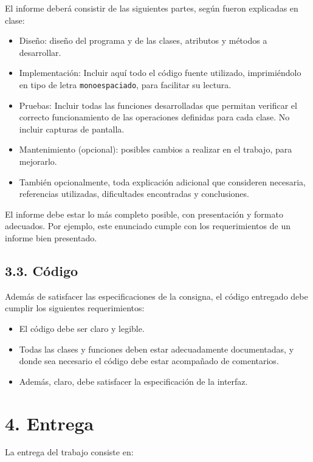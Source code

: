 \documentclass[12pt,spanish,]{article}
\begin{document}
El informe deberá consistir de las siguientes partes, según fueron
explicadas en clase:

\begin{itemize}
\item
  Diseño: diseño del programa y de las clases, atributos y métodos a
  desarrollar.
\item
  Implementación: Incluir aquí todo el código fuente utilizado,
  imprimiéndolo en tipo de letra \texttt{monoespaciado}, para facilitar
  su lectura.
\item
  Pruebas: Incluir todas las funciones desarrolladas que permitan
  verificar el correcto funcionamiento de las operaciones definidas para
  cada clase. No incluir capturas de pantalla.
\item
  Mantenimiento (opcional): posibles cambios a realizar en el trabajo,
  para mejorarlo.
\item
  También opcionalmente, toda explicación adicional que consideren
  necesaria, referencias utilizadas, dificultades encontradas y
  conclusiones.
\end{itemize}

El informe debe estar lo más completo posible, con presentación y
formato adecuados. Por ejemplo, este enunciado cumple con los
requerimientos de un informe bien presentado.

\subsection{3.3. Código}\label{cuxf3digo}

Además de satisfacer las especificaciones de la consigna, el código
entregado debe cumplir los siguientes requerimientos:

\begin{itemize}
\item
  El código debe ser claro y legible.
\item
  Todas las clases y funciones deben estar adecuadamente documentadas, y
  donde sea necesario el código debe estar acompañado de comentarios.
\item
  Además, claro, debe satisfacer la especificación de la interfaz.
\end{itemize}

\section{4. Entrega}\label{entrega}

La entrega del trabajo consiste en:
\end{document}

